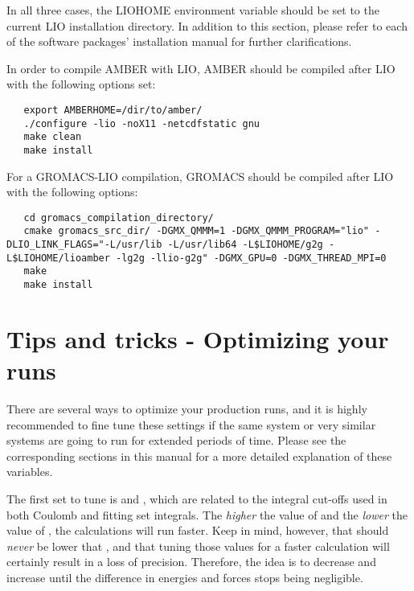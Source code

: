 In all three cases, the LIOHOME environment variable should be set to the current
LIO installation directory. In addition to this section, please refer to each
of the software packages' installation manual for further clarifications.

In order to compile AMBER with LIO, AMBER should be compiled after LIO with the
following options set:

\begin{lstlisting}
   export AMBERHOME=/dir/to/amber/
   ./configure -lio -noX11 -netcdfstatic gnu
   make clean
   make install
\end{lstlisting}

For a GROMACS-LIO compilation, GROMACS should be compiled after LIO with the 
following options:

\begin{lstlisting}
   cd gromacs_compilation_directory/
   cmake gromacs_src_dir/ -DGMX_QMMM=1 -DGMX_QMMM_PROGRAM="lio" -DLIO_LINK_FLAGS="-L/usr/lib -L/usr/lib64 -L$LIOHOME/g2g -L$LIOHOME/lioamber -lg2g -llio-g2g" -DGMX_GPU=0 -DGMX_THREAD_MPI=0
   make
   make install
\end{lstlisting}

\section{Tips and tricks - Optimizing your runs}
There are several ways to optimize your production runs, and it is highly recommended
to fine tune these settings if the same system or very similar systems are going to
run for extended periods of time. Please see the corresponding sections in this manual
for a more detailed explanation of these variables.

The first set to tune is  and , which are
related to the integral cut-offs used in both Coulomb and fitting set integrals. The
\textit{higher} the value of  and the \textit{lower} the value
of , the calculations will run faster. Keep in mind, however,
that  should \textit{never} be lower that ,
and that tuning those values for a faster calculation will certainly result in a loss
of precision. Therefore, the idea is to decrease   and increase
 until the difference in energies and forces stops being
negligible.

